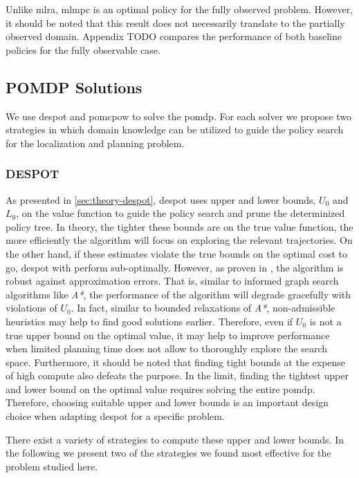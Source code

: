 Unlike \ac{mlra}, \ac{mlmpc} is an optimal policy for the fully observed
problem. However, it should be noted that this result does not necessarily
translate to the partially observed domain. Appendix TODO compares the performance of both baseline policies for the fully
observable case.

\subsection{POMDP Solutions}\label{sec:lp-planners}

We use \ac{despot} and \ac{pomcpow} to solve the \ac{pomdp}. For each solver we
propose two strategies in which domain knowledge can be utilized to guide the
policy search for the localization and planning problem.

\subsubsection{DESPOT}\label{sec:lp-planners-despot}

As presented in \cref{sec:theory-despot}, \ac{despot} uses upper and lower
bounds, $U_0$ and $L_0$, on the value function to guide the policy search and
prune the determinized policy tree. In theory, the tighter these bounds are on
the true value function, the more efficiently the algorithm will focus on
exploring the relevant trajectories. On the other hand, if these estimates
violate the true bounds on the optimal cost to go, \ac{despot} with perform
sub-optimally. However, as proven in \cite{somani2013despot}, the algorithm is
robust against approximation errors. That is, similar to informed graph search
algorithms like \emph{A*}, the performance of the algorithm will degrade
gracefully with violations of $U_0$. In fact, similar to bounded relaxations of
\emph{A*}, non-admissible heuristics may help to find good solutions earlier.
Therefore, even if $U_0$ is not a true upper bound on the optimal value, it may
help to improve performance when limited planning time does not allow to
thoroughly explore the search space. Furthermore, it should be noted that
finding tight bounds at the expense of high compute also defeats the purpose.
In the limit, finding the tightest upper and lower bound on the optimal value
requires solving the entire \ac{pomdp}. Therefore, choosing suitable upper and
lower bounds is an important design choice when adapting \ac{despot} for
a specific problem.

There exist a variety of strategies to compute these upper and lower bounds.
In the following we present two of the strategies we found most effective for
the problem studied here.

